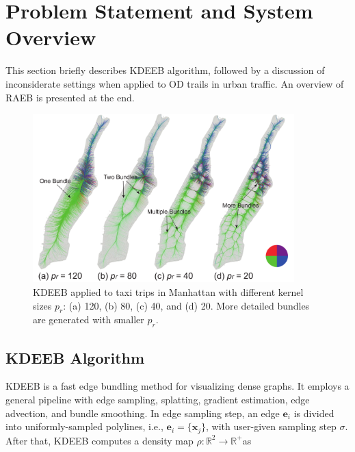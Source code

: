 \section{Problem Statement and System Overview}
\label{sec:overview}

This section briefly describes KDEEB algorithm, followed by a discussion of inconsiderate settings when applied to OD trails in urban traffic.
An overview of RAEB is presented at the end.

\begin{figure}[t] 
	\centering
	\includegraphics[width=0.90\textwidth]{figure/edgebundling/fig2_kernel_size/kernel_size}
	\vspace{-3mm}
	\caption{KDEEB applied to taxi trips in Manhattan with different kernel sizes $p_r$: (a) 120, (b) 80, (c) 40, and (d) 20.
	More detailed bundles are generated with smaller $p_r$.}
	\label{fig:kernel_size}
	\vspace{-1mm}
\end{figure}


\subsection{KDEEB Algorithm}
\label{ssec:kdeeb}
KDEEB is a fast edge bundling method for visualizing dense graphs.
It employs a general pipeline with edge sampling, splatting, gradient estimation, edge advection, and bundle smoothing.
In edge sampling step, an edge $\textbf{e}_i$ is divided into uniformly-sampled polylines, i.e., $\textbf{e}_i = \{\textbf{x}_j\}$, with user-given sampling step $\sigma$.
After that, KDEEB computes a density map $\rho : \mathbb{R}^2 \rightarrow \mathbb{R}^+ $as

